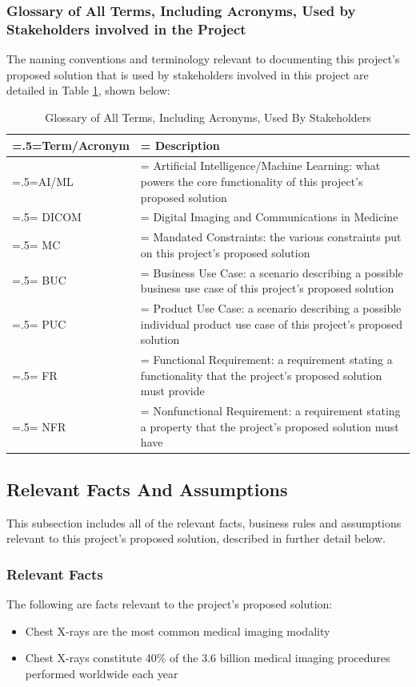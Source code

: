 \documentclass[12pt]{article}
\begin{document}
\subsubsection{Glossary of All Terms, Including Acronyms, Used by Stakeholders
involved in the Project}
The naming conventions and terminology relevant to documenting this project's proposed solution that is used by stakeholders involved in this project are detailed in Table \ref{table:glossaryOfTerms}, shown below:
\begin{table}[H]
    \caption{Glossary of All Terms, Including Acronyms, Used By Stakeholders}
    \label{table:glossaryOfTerms}
    \begin{tabularx}{\textwidth}{|>{\hsize=.5\hsize\linewidth=\hsize}X|>{\hsize=1.5\hsize\linewidth=\hsize}X|}
    \hline
    Term/Acronym & Description \\
    \hline
    AI/ML & Artificial Intelligence/Machine Learning: what powers the core functionality of this project's proposed solution \\
    \hline
    DICOM & Digital Imaging and Communications in Medicine \\
    \hline
    MC & Mandated Constraints: the various constraints put on this project's proposed solution \\
    \hline
    BUC & Business Use Case: a scenario describing a possible business use case of this project's proposed solution \\
    \hline
    PUC & Product Use Case: a scenario describing a possible individual product use case of this project's proposed solution \\
    \hline
    FR & Functional Requirement: a requirement stating a functionality that the project's proposed solution must provide \\
    \hline
    NFR & Nonfunctional Requirement: a requirement stating a property that the project's proposed solution must have \\
    \hline
    \end{tabularx}
\end{table}

\subsection{Relevant Facts And Assumptions}
This subsection includes all of the relevant facts, business rules and assumptions relevant to this project's proposed solution, described in further detail below.

\subsubsection{Relevant Facts}
The following are facts relevant to the project's proposed solution:
\begin{itemize}
    \item Chest X-rays are the most common medical imaging modality 
    \item Chest X-rays constitute 40\% of the 3.6 billion medical imaging procedures performed worldwide each year 
\end{itemize}
\end{document}
